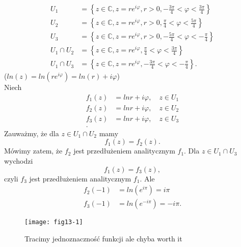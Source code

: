 \documentclass[../main.tex]{subfiles}
\begin{document}
\begin{przyklad}
    \begin{align*}
        U_1 &= \left\{ z\in\mathbb{C}, z = re^{i\varphi}, r > 0, -\frac{3\pi}{4} < \varphi < \frac{3\pi}{4}\right\}\\
        U_2 &= \left\{ z\in\mathbb{C}, z = re^{i\varphi}, r > 0, \frac{\pi}{4} < \varphi < \frac{5\pi}{4}\right\}\\
        U_3 &= \left\{ z\in\mathbb{C}, z = re^{i\varphi}, r > 0, -\frac{5\pi}{4} < \varphi < -\frac{\pi}{4}\right\}\\
        U_1 \cap U_2 &= \left\{ z\in\mathbb{C}, z = re^{i\varphi}, \frac{\pi}{4} < \varphi < \frac{3\pi}{4} \right\}\\
        U_1 \cap U_3 &= \left\{ z\in\mathbb{C}, z = re^{i\varphi}, -\frac{3\pi}{4} < \varphi < -\frac{\pi}{4} \right\}
    .\end{align*}
($ln(z) = ln(re^{i\varphi}) = ln(r) + i\varphi$)\\
    Niech
    \begin{align*}
        f_1(z) &= ln r + i\varphi,\quad z\in U_1\\
        f_2(z) &= ln r + i\varphi,\quad z\in U_2\\
        f_3(z) &= ln r + i\varphi,\quad z\in U_3\\
    .\end{align*}
    Zauważmy, że dla $z\in U_1\cap U_2$ mamy
    \[
        f_1(z) = f_2(z)
    .\]
Mówimy zatem, że $f_2$ jest przedłużeniem analitycznym $f_1$. Dla $z\in U_1\cap U_3$ wychodzi
    \[
        f_1(z) = f_3(z)
    ,\]
czyli $f_3$ jest przedłużeniem analitycznym $f_1$. Ale
    \begin{align*}
        f_2(-1) &= ln (e^{i\pi}) = i\pi\\
        f_3(-1) &= ln (e^{-i\pi}) = -i\pi
    .\end{align*}
    \begin{figure}[h]
        \centering
        \texttt{[image: fig13-1]}
        \caption{Tracimy jednoznaczność funkcji ale chyba worth it}
    \end{figure}
\end{przyklad}
\end{document}
